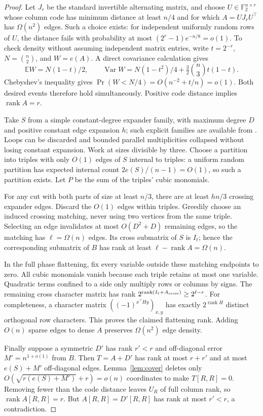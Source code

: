 \documentclass[11pt,a4paper]{article}
\theoremstyle{remark}\newtheorem{remark}[theorem]{Remark}
\newcommand{\F}{\mathbb F}\newcommand{\Z}{\mathbb Z}\newcommand{\Q}{\mathbb Q}
\newcommand{\rank}{\operatorname{rank}}\newcommand{\diag}{\operatorname{diag}}
\begin{document}
\begin{proof}
Let $J_r$ be the standard invertible alternating matrix,
and choose $U\in\F_2^{n\times r}$ whose column code has
minimum distance at least $n/4$ and for which
$A=UJ_rU^\top$ has $\Omega(n^2)$ edges.
Such a choice exists: for independent uniformly random
rows of $U$, the distance fails with probability at most
$(2^r-1)e^{-n/8}=o(1)$. To check density without assuming
independent matrix entries, write $t=2^{-r}$,
$N=\binom n2$, and $W=e(A)$. A direct covariance
calculation gives
\[
\mathbb EW=N(1-t)/2,\qquad
\operatorname{Var}W=
N(1-t^2)/4+\tfrac32\binom n3 t(1-t).
\]
Chebyshev's inequality gives
$\Pr(W<N/4)=O(n^{-2}+t/n)=o(1)$.
Both desired events therefore hold simultaneously.
Positive code distance implies $\rank A=r$.

Take $S$ from a simple constant-degree expander family,
with maximum degree $D$ and positive constant edge
expansion $h$; such explicit families are available
from \cite{expander}. Loops can be discarded and
bounded parallel multiplicities collapsed without
losing constant expansion. Work at sizes divisible by
three. Choose a partition into triples with only
$O(1)$ edges of $S$ internal to triples: a uniform
random partition has expected internal count
$2e(S)/(n-1)=O(1)$, so such a partition exists.
Let $P$ be the sum of the triples' cubic monomials.

For any cut with both parts of size at least $n/3$,
there are at least $hn/3$ crossing expander edges.
Discard the $O(1)$ edges within triples. Greedily
choose an induced crossing matching, never using
two vertices from the same triple. Selecting an
edge invalidates at most $O(D^2+D)$ remaining edges,
so the matching has $\ell=\Omega(n)$ edges.
Its cross submatrix of $S$ is $I_\ell$; hence the
corresponding submatrix of $B$ has rank at least
$\ell-\rank A=\Omega(n)$.

In the full phase flattening, fix every variable
outside these matching endpoints to zero. All cubic
monomials vanish because each triple retains at most
one variable. Quadratic terms confined to a side
only multiply rows or columns by signs. The remaining
cross character matrix has rank
$2^{\rank(I_\ell+A_{\rm cross})}\ge2^{\ell-r}$.
For completeness, a character matrix
$((-1)^{x^\top Hy})_{x,y}$ has exactly
$2^{\rank H}$ distinct orthogonal row characters.
This proves the claimed flattening rank.
Adding $O(n)$ sparse edges to dense $A$ preserves
$\Omega(n^2)$ edge density.

Finally suppose a symmetric $D'$ has rank $r'<r$
and off-diagonal error $M'=n^{1+o(1)}$ from $B$.
Then $T=A+D'$ has rank at most $r+r'$ and at most
$e(S)+M'$ off-diagonal edges. Lemma~\ref{lem:cover}
deletes only
$O(\sqrt{r(e(S)+M')}+r)=o(n)$ coordinates to make
$T[R,R]=0$. Removing fewer than the code distance
leaves $U_R$ of full column rank, so
$\rank A[R,R]=r$. But $A[R,R]=D'[R,R]$ has rank
at most $r'<r$, a contradiction.
\end{proof}
\end{document}
